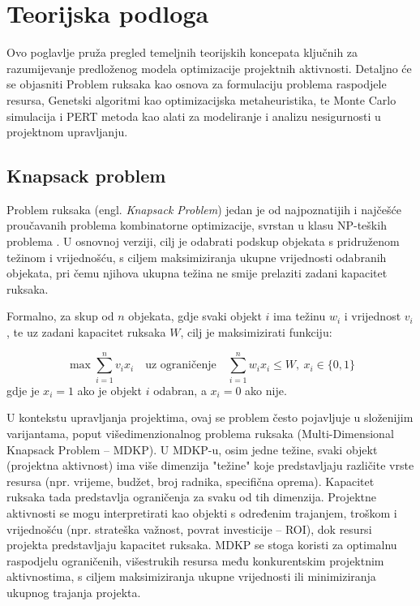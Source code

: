 
\section{Teorijska podloga}

Ovo poglavlje pruža pregled temeljnih teorijskih koncepata ključnih za razumijevanje predloženog modela optimizacije projektnih aktivnosti. Detaljno će se objasniti Problem ruksaka kao osnova za formulaciju problema raspodjele resursa, Genetski algoritmi kao optimizacijska metaheuristika, te Monte Carlo simulacija i PERT metoda kao alati za modeliranje i analizu nesigurnosti u projektnom upravljanju.

\subsection{Knapsack problem}

Problem ruksaka (engl. \textit{Knapsack Problem}) jedan je od najpoznatijih i najčešće proučavanih problema kombinatorne optimizacije, svrstan u klasu NP-teških problema \cite{Goldberg1989}. U osnovnoj verziji, cilj je odabrati podskup objekata s pridruženom težinom i vrijednošću, s ciljem maksimiziranja ukupne vrijednosti odabranih objekata, pri čemu njihova ukupna težina ne smije prelaziti zadani kapacitet ruksaka.

Formalno, za skup od $n$ objekata, gdje svaki objekt $i$ ima težinu $w_i$ i vrijednost $v_i$, te uz zadani kapacitet ruksaka $W$, cilj je maksimizirati funkciju:

\[
\max \sum_{i=1}^n v_i x_i \quad \text{uz ograničenje} \quad \sum_{i=1}^n w_i x_i \leq W,\ x_i \in \{0,1\}
\]
gdje je $x_i = 1$ ako je objekt $i$ odabran, a $x_i = 0$ ako nije.

U kontekstu upravljanja projektima, ovaj se problem često pojavljuje u složenijim varijantama, poput višedimenzionalnog problema ruksaka (Multi-Dimensional Knapsack Problem – MDKP). U MDKP-u, osim jedne težine, svaki objekt (projektna aktivnost) ima više dimenzija "težine" koje predstavljaju različite vrste resursa (npr. vrijeme, budžet, broj radnika, specifična oprema). Kapacitet ruksaka tada predstavlja ograničenja za svaku od tih dimenzija. Projektne aktivnosti se mogu interpretirati kao objekti s određenim trajanjem, troškom i vrijednošću (npr. strateška važnost, povrat investicije – ROI), dok resursi projekta predstavljaju kapacitet ruksaka. MDKP se stoga koristi za optimalnu raspodjelu ograničenih, višestrukih resursa među konkurentskim projektnim aktivnostima, s ciljem maksimiziranja ukupne vrijednosti ili minimiziranja ukupnog trajanja projekta.


